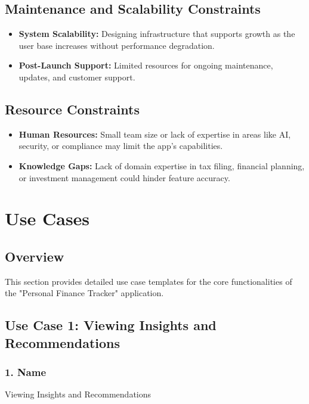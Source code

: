 \subsection{Maintenance and Scalability Constraints}
\begin{itemize}
    \item \textbf{System Scalability:} Designing infrastructure that supports growth as the user base increases without performance degradation.
    \item \textbf{Post-Launch Support:} Limited resources for ongoing maintenance, updates, and customer support.
\end{itemize}

\subsection{Resource Constraints}
\begin{itemize}
    \item \textbf{Human Resources:} Small team size or lack of expertise in areas like AI, security, or compliance may limit the app's capabilities.
    \item \textbf{Knowledge Gaps:} Lack of domain expertise in tax filing, financial planning, or investment management could hinder feature accuracy.
\end{itemize}

\section{Use Cases}


\subsection*{Overview}
This section provides detailed use case templates for the core functionalities of the "Personal Finance Tracker" application.

\subsection {Use Case 1: Viewing Insights and Recommendations}
\begin{useCase}
\end{useCase}

\subsubsection*{1. Name}
Viewing Insights and Recommendations

